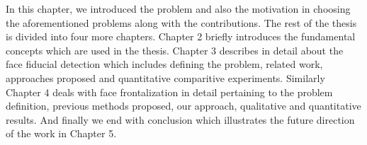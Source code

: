 % 
%     
% 

In this chapter, we introduced the problem and also the motivation
in choosing the aforementioned problems along with the contributions.
The rest of the thesis is divided into four more chapters. Chapter 2 briefly introduces the
fundamental concepts which are used in the thesis. Chapter 3 describes in detail
about the face fiducial detection which includes defining the problem, related work, 
approaches proposed and quantitative comparitive experiments. Similarly Chapter 4 deals
with face frontalization in detail pertaining to the problem definition, previous methods
proposed, our approach, qualitative and quantitative results. And finally we end with
conclusion which illustrates the future direction of the work in Chapter 5.
